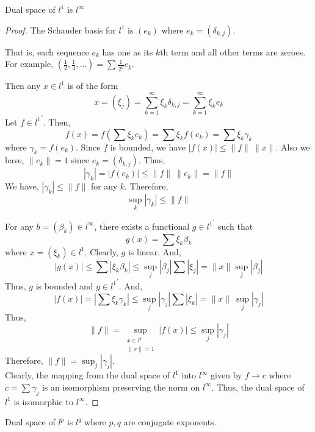 \begin{important}
\begin{remark}
	Dual space of $l^1$ is $l^\infty$
\end{remark}
\end{important}
\begin{proof}
	The Schauder basis for $l^1$ is $(e_k)$ where $e_k = (\delta_{k,j})$.
	\begin{commentary}
	That is, each sequence $e_k$ has one as its $k$th term and all other terms are zeroes.
	For example, $(\frac{1}{2},\frac{1}{4},\dotsc) = \sum \frac{1}{2^k} e_k$.
	\end{commentary}	
	Then any $x \in l^1$ is of the form
	\[ x = (\xi_j) = \sum_{k=1}^\infty \xi_k \delta_{k,j} = \sum_{k =1}^\infty \xi_k e_k \]
	Let $f \in {l^1}^\prime$.
	Then,
	\[ f(x) = f\left(\sum \xi_k e_k\right) = \sum \xi_k f(e_k) = \sum \xi_k \gamma_k \]
	where $\gamma_k = f(e_k)$.
	Since $f$ is bounded, we have $|f(x)| \le \|f\| \ \|x\|$.
	Also we have, $\|e_k\| = 1$ since $e_k = (\delta_{k,j})$.
	Thus,
	\[ |\gamma_k| = |f(e_k)| \le \|f\| \ \|e_k\| = \|f\| \]
	We have, $|\gamma_k| \le \|f\|$ for any $k$.
	Therefore,
	\[ \sup_k |\gamma_k| \le \|f\| \]

	For any $b = (\beta_k) \in l^\infty$, there exists a functional $g \in {l^1}^\prime$ such that
	\[ g(x) = \sum \xi_k \beta_k \]
	where $x = (\xi_k) \in l^1$.
	Clearly, $g$ is linear.
	And,
	\[ |g(x)| \le \sum |\xi_k \beta_k| \le \sup_j |\beta_j| \sum |\xi_j| = \|x\| \sup_j |\beta_j| \]
	Thus, $g$ is bounded and $g \in {l^1}^\prime$.
	And,
	\[ |f(x)| = \left| \sum \xi_k \gamma_k \right| \le \sup_j |\gamma_j| \sum |\xi_k| = \|x\| \ \sup_j |\gamma_j| \]
	Thus,
	\[ \|f\| = \sup_{\substack{x \in l^1\\ \|x\| =1 }} |f(x)| \le \sup_j |\gamma_j| \]
	Therefore, $\|f\| = \sup_j |\gamma_j|$.\\

	Clearly, the mapping from the dual space of ${l^1}$ into $l^\infty$ given by $f \to c$ where $c = \sum \gamma_j$ is an isomorphism preserving the norm on $l^\infty$.
	Thus, the dual space of $l^1$ is isomorphic to $l^\infty$.
\end{proof}
\begin{important}
\begin{remark}
	Dual space of $l^p$ is $l^q$ where $p,q$ are conjugate exponents.
\end{remark}
\end{important}
